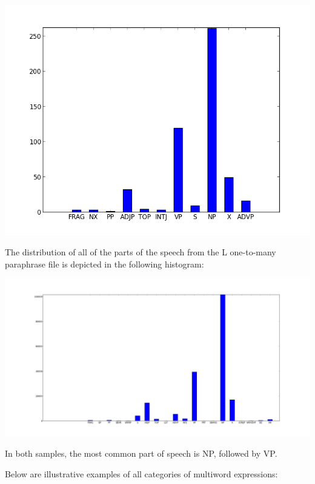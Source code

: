 \documentclass[11pt]{article}
\begin{document}
\begin{center}
\includegraphics[width=150mm]{figs/random_sample_pos_histogram_500.png}
\end{center}

The distribution of all of the parts of the speech from the L one-to-many paraphrase file is depicted in the following histogram:

\begin{center}
\includegraphics[width=175mm]{figs/random_sample_pos_histogram_all.png}
\end{center}

In both samples, the most common part of speech is NP, followed by VP. 

Below are illustrative examples of all categories of multiword expressions:
\end{document}
